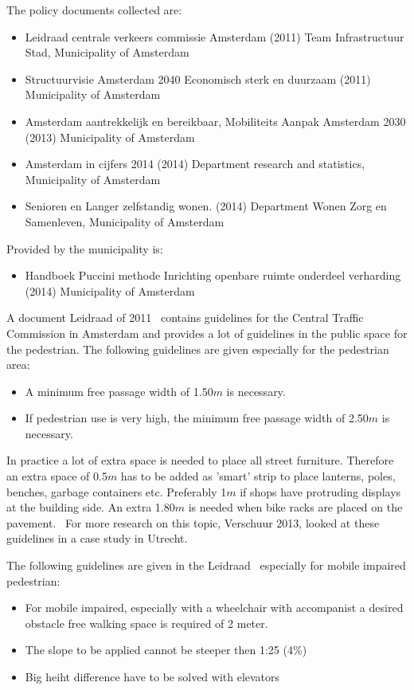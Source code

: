 The policy documents collected are:
\begin{itemize}
\item Leidraad centrale verkeers commissie Amsterdam (2011) Team Infrastructuur Stad, Municipality of Amsterdam ~\cite{leidraad2011}
\item Structuurvisie Amsterdam 2040 Economisch sterk en duurzaam (2011) Municipality of Amsterdam ~\cite{Bossink2011}
\item Amsterdam aantrekkelijk en bereikbaar, Mobiliteits Aanpak Amsterdam 2030 (2013) Municipality of Amsterdam ~\cite{Kuik2013}
\item Amsterdam in cijfers 2014 (2014) Department research and statistics, Municipality of Amsterdam ~\cite{Hylkema2014}
\item Senioren en Langer zelfstandig wonen. (2014) Department Wonen Zorg en Samenleven, Municipality of Amsterdam ~\cite{Booi2014}
\end{itemize}

Provided by the municipality is:
\begin{itemize}
\item Handboek Puccini methode Inrichting openbare ruimte onderdeel verharding (2014) Municipality of Amsterdam ~\cite{puccini2014}
\end{itemize}

A document Leidraad of 2011~\cite{leidraad2011} contains guidelines for the Central Traffic Commission in Amsterdam and provides a lot of guidelines in the public space for the pedestrian. The following guidelines are given especially for the pedestrian area:

\begin{itemize}
\item A minimum free passage width of 1.50$m$ is necessary. 
\item If pedestrian use is very high, the minimum free passage width of 2.50$m$ is necessary.
\end{itemize}

In practice a lot of extra space is needed to place all street furniture. Therefore an extra space of 0.5$m$ has to be added as 'smart' strip to place lanterns, poles, benches, garbage containers etc. Preferably 1$m$ if shops have protruding displays at the building side. An extra 1.80$m$ is needed when bike racks are placed on the pavement.~\cite{leidraad2011} For more research on this topic, Verschuur 2013, looked at these guidelines in a case study in Utrecht.~\cite{Verschuur2013}

The following guidelines are given in the Leidraad~\cite{leidraad2011} especially for mobile impaired pedestrian:
\begin{itemize}
\item For mobile impaired, especially with a wheelchair with accompanist a desired obstacle free walking space is required of 2 meter.
\item The slope to be applied cannot be steeper then 1:25 (4\%)
\item Big heiht difference have to be solved with elevators 
\end{itemize}

